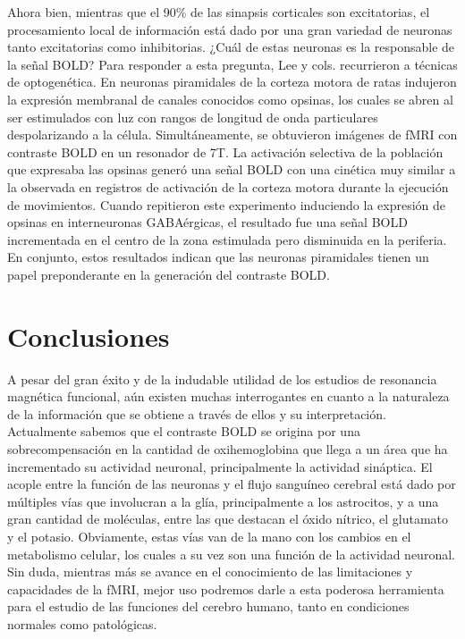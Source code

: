 Ahora bien, mientras que el 90\% de las sinapsis corticales son excitatorias, el procesamiento local de información está dado por una gran variedad de neuronas tanto excitatorias como inhibitorias. ¿Cuál de estas neuronas es la responsable de la señal BOLD? Para responder a esta pregunta, Lee y cols. \cite{LeeJH2010} recurrieron a técnicas de optogenética. En neuronas piramidales de la corteza motora de ratas indujeron la expresión membranal de canales conocidos como opsinas, los cuales se abren al ser estimulados con luz con rangos de longitud de onda particulares despolarizando a la célula. Simultáneamente, se obtuvieron imágenes de fMRI con contraste BOLD en un resonador de 7T. La activación selectiva de la población que expresaba las opsinas generó una señal BOLD con una cinética muy similar a la observada en registros de activación de la corteza motora durante la ejecución de movimientos. Cuando repitieron este experimento induciendo la expresión de opsinas en interneuronas GABAérgicas, el resultado fue una señal BOLD incrementada en el centro de la zona estimulada pero disminuida en la periferia. En conjunto, estos resultados indican que las neuronas piramidales tienen un papel preponderante en la generación del contraste BOLD.

\section{Conclusiones}
A pesar del gran éxito y de la indudable utilidad de los estudios de resonancia magnética funcional, aún existen muchas interrogantes en cuanto a la naturaleza de la información que se obtiene a través de ellos y su interpretación. Actualmente sabemos que el contraste BOLD se origina por una sobrecompensación en la cantidad de oxihemoglobina que llega a un área que ha incrementado su actividad neuronal, principalmente la actividad sináptica. El acople entre la función de las neuronas y el flujo sanguíneo cerebral está dado por múltiples vías que involucran a la glía, principalmente a los astrocitos, y a una gran cantidad de moléculas, entre las que destacan el óxido nítrico, el glutamato y el potasio. Obviamente, estas vías van de la mano con los cambios en el metabolismo celular, los cuales a su vez son una función de la actividad neuronal. Sin duda, mientras más se avance en el conocimiento de las limitaciones y capacidades de la fMRI, mejor uso podremos darle a esta poderosa herramienta para el estudio de las funciones del cerebro humano, tanto en condiciones normales como patológicas. 